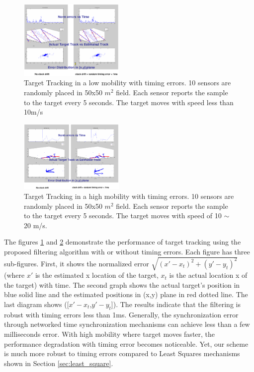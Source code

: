  \begin{figure}
    \begin{center}

    \includegraphics[height=0.45\textheight,width=0.45\textwidth,bbllx=38,bblly=254,bburx=510,bbury=605]{figures/estimationlow}
    \caption{Target Tracking in a low mobility with timing errors. 10 sensors are randomly placed in 50x50 $m^2$ field. Each sensor reports the sample to the target every 5 seconds. The target moves with speed less than 10m/s}
        \label{fig:estimation_low}
    \end{center}
\end{figure}

\begin{figure}
    \begin{center}

    \includegraphics[height=0.45\textheight,width=0.45\textwidth,bbllx=51,bblly=262,bburx=588,bbury=615]{figures/estimationhigh}
    \caption{Target Tracking in a high mobility with timing errors. 10 sensors are randomly placed in 50x50 $m^2$ field. Each sensor reports the sample to the target every 5 seconds. The target moves with speed of 10 $\sim$ 20 m/s. }
        \label{fig:estimation_high}
    \end{center}
\end{figure}

The figures \ref{fig:estimation_low} and \ref{fig:estimation_high}
demonstrate the performance of target tracking using the proposed
filtering algorithm with or without timing errors. Each figure has
three sub-figures. First, it shows the normalized error
$\sqrt{(x'-x_t)^2+(y'-y_t)^2}$ (where $x'$ is the estimated x
location of the target, $x_t$ is the actual location x of the
target) with time. The second graph shows the actual target's
position in blue solid line and the estimated positions in (x,y)
plane in red dotted line. The last diagram shows
([$x'-x_t$,$y'-y_t$]). The results indicate that the filtering is
robust with timing errors less than 1ms. Generally, the
synchronization error through networked time synchronization
mechanisms can achieve less than a few milliseconds error. With high
mobility where target moves faster, the performance degradation with
timing error becomes noticeable. Yet, our scheme is much more robust
to timing errors compared to Least Squares mechanisms shown in
Section \ref{sec:least_square}.
